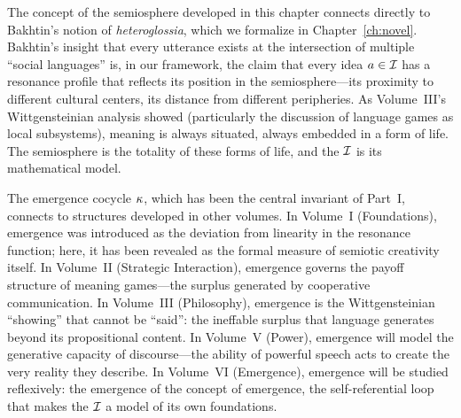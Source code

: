 \begin{remark}
The concept of the semiosphere developed in this chapter connects directly to Bakhtin's notion of \emph{heteroglossia}, which we formalize in Chapter~\ref{ch:novel}. Bakhtin's insight that every utterance exists at the intersection of multiple ``social languages'' is, in our framework, the claim that every idea $a \in \mathcal{I}$ has a resonance profile that reflects its position in the semiosphere---its proximity to different cultural centers, its distance from different peripheries. As Volume~III's Wittgensteinian analysis showed (particularly the discussion of language games as local subsystems), meaning is always situated, always embedded in a form of life. The semiosphere is the totality of these forms of life, and the $\mathcal{I}$ is its mathematical model.
\end{remark}

\begin{remark}
The emergence cocycle $\kappa$, which has been the central invariant of Part~I, connects to structures developed in other volumes. In Volume~I (Foundations), emergence was introduced as the deviation from linearity in the resonance function; here, it has been revealed as the formal measure of semiotic creativity itself. In Volume~II (Strategic Interaction), emergence governs the payoff structure of meaning games---the surplus generated by cooperative communication. In Volume~III (Philosophy), emergence is the Wittgensteinian ``showing'' that cannot be ``said'': the ineffable surplus that language generates beyond its propositional content. In Volume~V (Power), emergence will model the generative capacity of discourse---the ability of powerful speech acts to create the very reality they describe. In Volume~VI (Emergence), emergence will be studied reflexively: the emergence of the concept of emergence, the self-referential loop that makes the $\mathcal{I}$ a model of its own foundations.
\end{remark}
